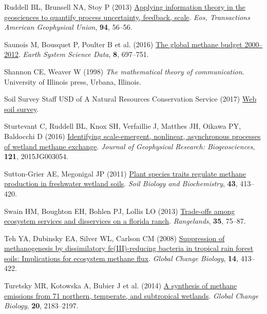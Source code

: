 \documentclass[
  12pt,
]{article}
\newlength{\cslhangindent}
\newenvironment{CSLReferences}[2] %
 {\begin{list}{}{%
  \setlength{\itemindent}{0pt}
  \setlength{\leftmargin}{0pt}
  \setlength{\parsep}{0pt}
  \ifodd #1
   \setlength{\leftmargin}{\cslhangindent}
   \setlength{\itemindent}{-1\cslhangindent}
  \fi
  \setlength{\itemsep}{#2\baselineskip}}}
 {\end{list}}
\begin{document}
\begin{CSLReferences}{1}{0}
Ruddell BL, Brunsell NA, Stoy P (2013)
\href{https://doi.org/10.1002/2013EO050007}{Applying information theory
in the geosciences to quantify process uncertainty, feedback, scale}.
\emph{Eos, Transactions American Geophysical Union}, \textbf{94},
56--56.

Saunois M, Bousquet P, Poulter B et al. (2016)
\href{https://doi.org/10.5194/essd-8-697-2016}{The global methane budget
2000--2012}. \emph{Earth System Science Data}, \textbf{8}, 697--751.

Shannon CE, Weaver W (1998) \emph{\emph{The mathematical theory of
communication}}. University of Illinois press, Urbana, Illinois.

Soil Survey Staff USD of A Natural Resources Conservation Service (2017)
\href{https://websoilsurvey.sc.egov.usda.gov/App/HomePage.htm}{Web soil
survey}.

Sturtevant C, Ruddell BL, Knox SH, Verfaillie J, Matthes JH, Oikawa PY,
Baldocchi D (2016)
\href{https://doi.org/10.1002/2015JG003054}{Identifying scale-emergent,
nonlinear, asynchronous processes of wetland methane exchange}.
\emph{Journal of Geophysical Research: Biogeosciences}, \textbf{121},
2015JG003054.

Sutton-Grier AE, Megonigal JP (2011)
\href{https://doi.org/10.1016/j.soilbio.2010.11.009}{Plant species
traits regulate methane production in freshwater wetland soils}.
\emph{Soil Biology and Biochemistry}, \textbf{43}, 413--420.

Swain HM, Boughton EH, Bohlen PJ, Lollis LO (2013)
\href{https://doi.org/10.2111/RANGELANDS-D-13-00053.1}{Trade-offs among
ecosystem services and disservices on a florida ranch}.
\emph{Rangelands}, \textbf{35}, 75--87.

Teh YA, Dubinsky EA, Silver WL, Carlson CM (2008)
\href{https://doi.org/10.1111/j.1365-2486.2007.01487.x}{Suppression of
methanogenesis by dissimilatory fe({III})-reducing bacteria in tropical
rain forest soils: Implications for ecosystem methane flux}.
\emph{Global Change Biology}, \textbf{14}, 413--422.

Turetsky MR, Kotowska A, Bubier J et al. (2014)
\href{https://doi.org/10.1111/gcb.12580}{A synthesis of methane
emissions from 71 northern, temperate, and subtropical wetlands}.
\emph{Global Change Biology}, \textbf{20}, 2183--2197.


\end{CSLReferences}
\end{document}
